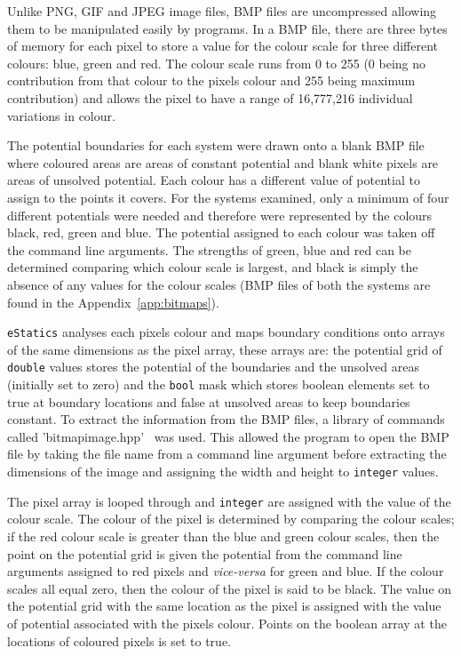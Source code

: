 Unlike PNG, GIF and JPEG image files, BMP files are uncompressed allowing them to be manipulated easily by programs. In a BMP file, there are three bytes of memory for each pixel to store a value for the colour scale for three different colours: blue, green and red. The colour scale runs from 0 to 255 (0 being no contribution from that colour to the pixels colour and 255 being maximum contribution) and allows the pixel to have a range of 16,777,216 individual variations in colour.

The potential boundaries for each system were drawn onto a blank BMP file where coloured areas are areas of constant potential and blank white pixels are areas of unsolved potential. Each colour has a different value of potential to assign to the points it covers. For the systems examined, only a minimum of four different potentials were needed and therefore were represented by the colours black, red, green and blue. The potential assigned to each colour was taken off the command line arguments. The strengths of green, blue and red can be determined comparing which colour scale is largest, and black is simply the absence of any values for the colour scales (BMP files of both the systems are found in the Appendix~\ref{app:bitmaps}).

\lstinline|eStatics| analyses each pixels colour and maps boundary conditions onto arrays of the same dimensions as the pixel array, these arrays are: the potential grid of \lstinline|double| values stores the potential of the boundaries and the unsolved areas (initially set to zero) and the \lstinline|bool| mask which stores boolean elements set to true at boundary locations and false at unsolved areas to keep boundaries constant. To extract the information from the BMP files, a library of commands called 'bitmap\textunderscore image.hpp'~\cite{arash} was used. This allowed the program to open the BMP file  by taking the file name from a command line argument before extracting the dimensions of the image and assigning the width and height to \lstinline|integer| values.

The pixel array is looped through and \lstinline|integer| are assigned with the value of the colour scale. The colour of the pixel is determined by comparing the colour scales; if the red colour scale is greater than the blue and green colour scales, then the point on the potential grid is given the potential from the command line arguments assigned to red pixels and \emph{vice-versa} for green and blue. If the colour scales all equal zero, then the colour of the pixel is said to be black. The value on the potential grid with the same location as the pixel is assigned with the value of potential associated with the pixels colour. Points on the boolean array at the locations of coloured pixels is set to true.

